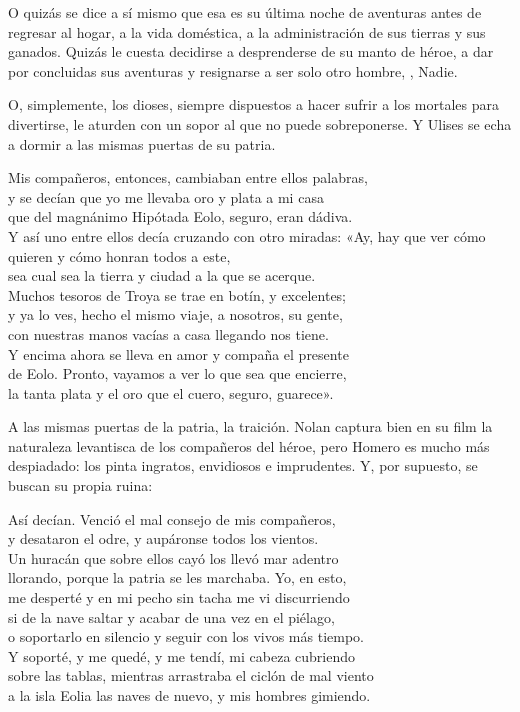 O quizás se dice a sí mismo que esa es su última noche de aventuras antes de regresar al hogar, a la vida doméstica, a la administración de sus tierras y sus ganados. Quizás le cuesta decidirse a desprenderse de su manto de héroe, a dar por concluidas sus aventuras y resignarse a ser solo otro hombre, , Nadie.

O, simplemente, los dioses, siempre dispuestos a hacer sufrir a los mortales para divertirse, le aturden con un sopor al que no puede sobreponerse. Y Ulises se echa a dormir a las mismas puertas de su patria.

\begin{versocita}
Mis compañeros, entonces, cambiaban entre ellos palabras,\\
y se decían que yo me llevaba oro y plata a mi casa\\
que del magnánimo Hipótada Eolo, seguro, eran dádiva.\\
Y así uno entre ellos decía cruzando con otro miradas:
\stanzabreak
«Ay, hay que ver cómo quieren y cómo honran todos a este,\\
sea cual sea la tierra y ciudad a la que se acerque.\\
Muchos tesoros de Troya se trae en botín, y excelentes;\\
y ya lo ves, hecho el mismo viaje, a nosotros, su gente,\\
con nuestras manos vacías a casa llegando nos tiene.\\
Y encima ahora se lleva en amor y compaña el presente\\
de Eolo. Pronto, vayamos a ver lo que sea que encierre,\\
la tanta plata y el oro que el cuero, seguro, guarece».
\end{versocita}

A las mismas puertas de la patria, la traición. Nolan captura bien en su film la naturaleza levantisca de los compañeros del héroe, pero Homero es mucho más despiadado: los pinta ingratos, envidiosos e imprudentes. Y, por supuesto, se buscan su propia ruina:

\begin{versocita}
Así decían. Venció el mal consejo de mis compañeros,\\
y desataron el odre, y aupáronse todos los vientos.\\
Un huracán que sobre ellos cayó los llevó mar adentro\\
llorando, porque la patria se les marchaba. Yo, en esto,\\
me desperté y en mi pecho sin tacha me vi discurriendo\\
si de la nave saltar y acabar de una vez en el piélago,\\
o soportarlo en silencio y seguir con los vivos más tiempo.\\
Y soporté, y me quedé, y me tendí, mi cabeza cubriendo\\
sobre las tablas, mientras arrastraba el ciclón de mal viento\\
a la isla Eolia las naves de nuevo, y mis hombres gimiendo.
\end{versocita}

